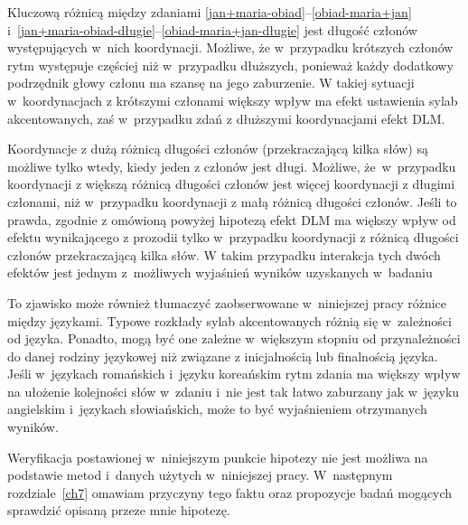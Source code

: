 Kluczową różnicą między zdaniami \eqref{jan+maria-obiad}--\eqref{obiad-maria+jan} i~\eqref{jan+maria-obiad-długie}--\eqref{obiad-maria+jan-długie} jest długość członów występujących w~nich koordynacji. Możliwe, że w~przypadku krótszych członów rytm występuje częściej niż w~przypadku dłuższych, ponieważ każdy dodatkowy podrzędnik głowy członu ma szansę na jego zaburzenie. W takiej sytuacji w~koordynacjach z krótszymi członami większy wpływ ma efekt ustawienia sylab akcentowanych, zaś w~przypadku zdań z dłuższymi koordynacjami efekt DLM.

Koordynacje z dużą różnicą długości członów (przekraczającą kilka słów) są możliwe tylko wtedy, kiedy jeden z członów jest długi. Możliwe,  że~w~przypadku koordynacji z większą różnicą długości członów jest więcej koordynacji z długimi członami, niż w~przypadku koordynacji z małą różnicą długości członów. Jeśli to prawda, zgodnie z omówioną powyżej hipotezą efekt DLM ma większy wpływ od efektu wynikającego z prozodii tylko w~przypadku koordynacji z różnicą długości członów przekraczającą kilka słów. W takim przypadku interakcja tych dwóch efektów jest jednym z~możliwych wyjaśnień wyników uzyskanych w~badaniu \citep{przepiorkowski2024argument}

To zjawisko może również tłumaczyć zaobserwowane w~niniejszej pracy różnice między językami. Typowe rozkłady sylab akcentowanych różnią się w~zależności od języka. Ponadto, mogą być one zależne w~większym stopniu od przynależności do danej rodziny językowej niż związane z inicjalnością lub finalnością języka. Jeśli w~językach romańskich i~języku koreańskim rytm zdania ma większy wpływ na ułożenie kolejności słów w~zdaniu i~nie jest tak łatwo zaburzany jak w~języku angielskim i~językach słowiańskich, może to być wyjaśnieniem otrzymanych wyników.

Weryfikacja postawionej w~niniejszym punkcie hipotezy nie jest możliwa na podstawie metod i~danych użytych w~niniejszej pracy. W~następnym rozdziale~\ref{ch7} omawiam przyczyny tego faktu oraz propozycje badań mogących sprawdzić opisaną przeze mnie hipotezę.
